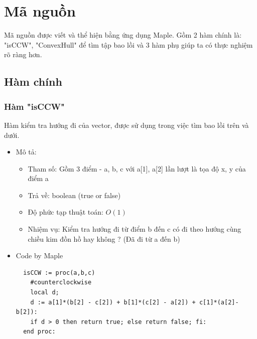 \documentclass[12pt]{article}
\begin{document}
    \section{Mã nguồn}
      Mã nguồn được viết và thể hiện bằng ứng dụng Maple. Gồm 2 hàm chính là: "isCCW", "ConvexHull" để tìm tập bao lồi và 3 hàm phụ giúp ta có thực nghiệm rõ ràng hơn.
      \subsection{Hàm chính}
      \subsubsection{Hàm "isCCW"}
        Hàm kiểm tra hướng đi của vector, được sử dụng trong việc tìm bao lồi trên và dưới.
        \begin{itemize}
          \item Mô tả:
          \begin{itemize}
            \item Tham số: Gồm 3 điểm - a, b, c với a[1], a[2] lần lượt là tọa độ x, y của điểm a 
            \item Trả về: boolean (true or false)
            \item Độ phức tạp thuật toán: $O(1)$
            \item Nhiệm vụ: Kiểm tra hướng đi từ điểm b đến c có đi theo hướng cùng chiều kim đồn hồ hay không ? (Đã đi từ a đến b)
          \end{itemize}
        \item Code by Maple 
        \begin{verbatim}
  isCCW := proc(a,b,c)
    #counterclockwise
    local d;
    d := a[1]*(b[2] - c[2]) + b[1]*(c[2] - a[2]) + c[1]*(a[2]-b[2]):
    if d > 0 then return true; else return false; fi:
  end proc:
        \end{verbatim}
      \end{itemize}
        \newpage
\end{document}
